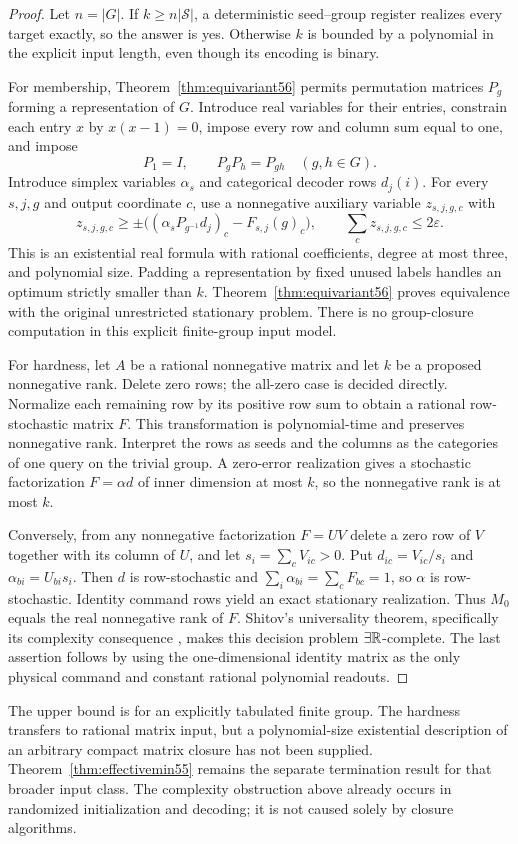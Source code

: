 \begin{proof}
Let $n=|G|$. If $k\ge n|\mathcal S|$, a deterministic seed--group register realizes every target exactly, so the answer is yes. Otherwise $k$ is bounded by a polynomial in the explicit input length, even though its encoding is binary.

For membership, Theorem~\ref{thm:equivariant56} permits permutation matrices $P_g$ forming a representation of $G$. Introduce real variables for their entries, constrain each entry $x$ by $x(x-1)=0$, impose every row and column sum equal to one, and impose
\[
                         P_1=I,
                 \qquad P_gP_h=P_{gh}\quad(g,h\in G).
\]
Introduce simplex variables $\alpha_s$ and categorical decoder rows $d_j(i)$. For every $s,j,g$ and output coordinate $c$, use a nonnegative auxiliary variable $z_{s,j,g,c}$ with
\[
 z_{s,j,g,c}\ge\pm\bigl((\alpha_sP_{g^{-1}}d_j)_c-F_{s,j}(g)_c\bigr),
 \qquad\sum_c z_{s,j,g,c}\le2\varepsilon.
\]
This is an existential real formula with rational coefficients, degree at most three, and polynomial size. Padding a representation by fixed unused labels handles an optimum strictly smaller than $k$. Theorem~\ref{thm:equivariant56} proves equivalence with the original unrestricted stationary problem. There is no group-closure computation in this explicit finite-group input model.

For hardness, let $A$ be a rational nonnegative matrix and let $k$ be a proposed nonnegative rank. Delete zero rows; the all-zero case is decided directly. Normalize each remaining row by its positive row sum to obtain a rational row-stochastic matrix $F$. This transformation is polynomial-time and preserves nonnegative rank. Interpret the rows as seeds and the columns as the categories of one query on the trivial group. A zero-error realization gives a stochastic factorization $F=\alpha d$ of inner dimension at most $k$, so the nonnegative rank is at most $k$.

Conversely, from any nonnegative factorization $F=UV$ delete a zero row of $V$ together with its column of $U$, and let $s_i=\sum_cV_{ic}>0$. Put $d_{ic}=V_{ic}/s_i$ and $\alpha_{bi}=U_{bi}s_i$. Then $d$ is row-stochastic and $\sum_i\alpha_{bi}=\sum_cF_{bc}=1$, so $\alpha$ is row-stochastic. Identity command rows yield an exact stationary realization. Thus $M_0$ equals the real nonnegative rank of $F$. Shitov's universality theorem, specifically its complexity consequence \cite[Theorem~2]{Shitov}, makes this decision problem $\exists\mathbb R$-complete. The last assertion follows by using the one-dimensional identity matrix as the only physical command and constant rational polynomial readouts.
\end{proof}
The upper bound is for an explicitly tabulated finite group. The hardness transfers to rational matrix input, but a polynomial-size existential description of an arbitrary compact matrix closure has not been supplied. Theorem~\ref{thm:effectivemin55} remains the separate termination result for that broader input class. The complexity obstruction above already occurs in randomized initialization and decoding; it is not caused solely by closure algorithms.

